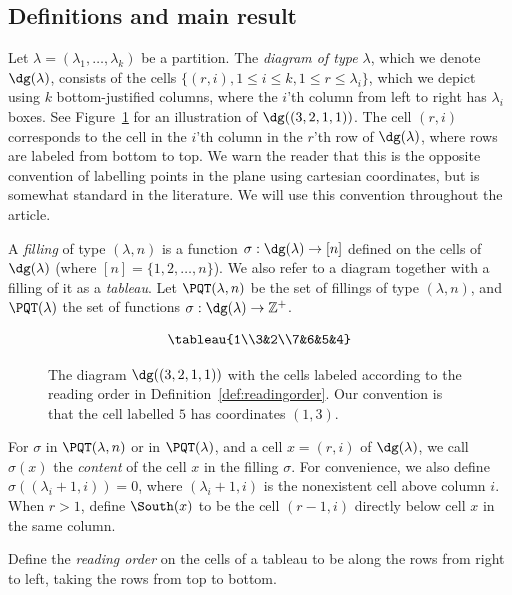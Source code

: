 \subsection{Definitions and main result}
\label{sec:definitions}
Let $\lambda=(\lambda_1,\ldots,\lambda_k)$ be a partition. The \emph{diagram of type $\lambda$}, which we denote $\dg(\lambda)$, consists of
the cells $\{(r,i), 1\leq i\leq k, 1\leq r\leq \lambda_i\}$, which we depict using
$k$ bottom-justified columns, where the $i$'th column from left to right has $\lambda_i$ boxes. See Figure~\ref{fig:readingorder} for an illustration of $\dg((3,2,1,1))$.
The cell $(r,i)$ corresponds to the cell in the $i$'th column in the $r$'th row of $\dg(\lambda)$, where rows are labeled from bottom to top. 
We warn the reader that this is the opposite convention of labelling points in the plane using cartesian coordinates, but is somewhat standard in the literature. We will use this convention throughout the article. 

A \emph{filling} of type $(\lambda,n)$ is a function $\sigma:\dg(\lambda) \rightarrow [n]$ defined on the cells of $\dg(\lambda)$ (where $[n]=\{1,2,\dots, n\}$).
We also refer to a diagram together with a filling of it as a \emph{tableau}.
Let $\PQT(\lambda,n)$ be the set of fillings of type $(\lambda, n)$,
and $\PQT(\lambda)$ the set of functions $\sigma:\dg(\lambda) \rightarrow \mathbb{Z}^+$.

\begin{center}
\begin{figure}[h]
\[
\tableau{1\\3&2\\7&6&5&4}
\]
\caption{The diagram $\dg((3,2,1,1))$ with the cells labeled according to the reading order in Definition~\ref{def:readingorder}. Our convention is that the cell labelled $5$ has coordinates $(1,3)$.}
\label{fig:readingorder}
\end{figure}
\end{center}

For $\sigma$ in $\PQT(\lambda, n)$ or in $\PQT(\lambda)$, and a cell $x=(r,i)$ of $\dg(\lambda)$, we call $\sigma(x)$ the \emph{content}
of the cell $x$ in the filling $\sigma$. 
For convenience, we also define $\sigma((\lambda_i+1,i))=0$, where $(\lambda_i+1,i)$ is the nonexistent cell above column $i$.
When $r>1$,  define $\South(x)$ to be the cell $(r-1,i)$ directly below cell $x$ in the same column. 

\begin{defn}
\label{def:readingorder}
Define the \emph{reading order} on the cells of a tableau to be along the rows from right to left,
taking the rows from top to bottom. 
\end{defn}

